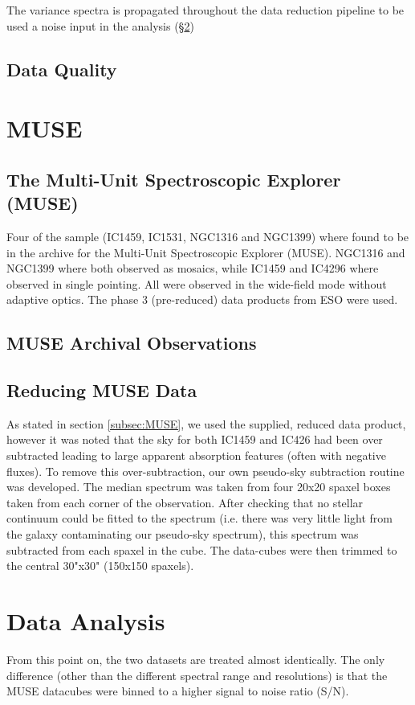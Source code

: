 		The variance spectra is propagated throughout the data reduction pipeline to be used a noise input in the analysis (\S \ref{sec:analysis})

	\subsection{Data Quality}
\section{MUSE}
	\label{sec:MUSE}
	\subsection{The Multi-Unit Spectroscopic Explorer (MUSE)}
		Four of the sample (IC1459, IC1531, NGC1316 and NGC1399) where found to be in the archive for the Multi-Unit Spectroscopic Explorer (MUSE). NGC1316 and NGC1399 where both observed as mosaics, while IC1459 and IC4296 where observed in single pointing. All were observed in the wide-field mode without adaptive optics. The phase 3 (pre-reduced) data products from ESO were used. 

	\subsection{MUSE Archival Observations}


	\subsection{Reducing MUSE Data}
		As stated in section \ref{subsec:MUSE}, we used the supplied, reduced data product, however it was noted that the sky for both IC1459 and IC426 had been over subtracted leading to large apparent absorption features (often with negative fluxes). To remove this over-subtraction, our own pseudo-sky subtraction routine was developed. The median spectrum was taken from four 20x20 spaxel boxes taken from each corner of the observation. After checking that no stellar continuum could be fitted to the spectrum (i.e. there was very little light from the galaxy contaminating our pseudo-sky spectrum), this spectrum was subtracted from each spaxel in the cube. The data-cubes were then trimmed to the central 30"x30" (150x150 spaxels).


\section{Data Analysis}
	\label{sec:analysis}
	From this point on, the two datasets are treated almost identically. The only difference (other than the different spectral range and resolutions) is that the MUSE datacubes were binned to a higher signal to noise ratio (S/N).



